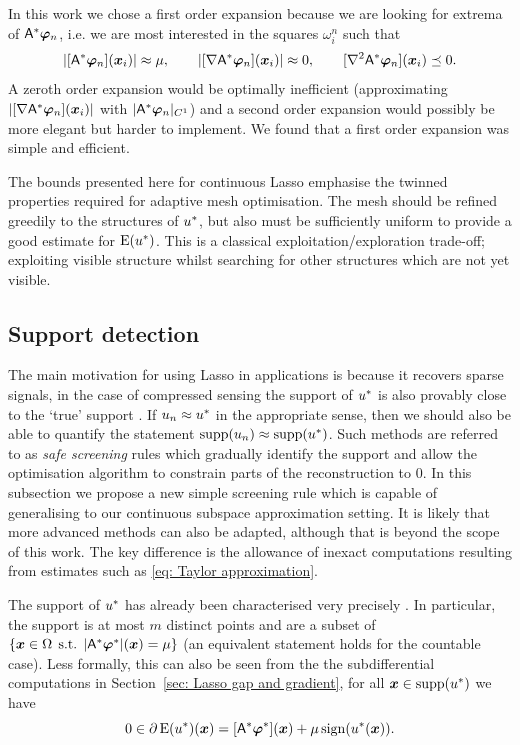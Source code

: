 \documentclass[smallextended]{svjour3}
\newcommand{\op}[1]{\operatorname{#1}}
\newcommand{\1}{\F{1}}
\DeclareMathOperator{\st}{\;s.t.\;}
\DeclareMathOperator{\supp}{supp}
\DeclareMathOperator{\sign}{sign}
\newcommand*{\varf}[1]{%
	\IfEqCase{#1}{%
		{0}{u}%
		{1}{v}%
		{2}{w}%
	}[u#1]%
}
\newcommand*{\vard}[1]{%
	\IfEqCase{#1}{%
		{0}{\varphi}%
		{1}{\psi}%
	}[\varphi #1]%
}
\newcommand*{\varx}[1]{%
	\IfEqCase{#1}{%
		{0}{x}%
		{1}{y}%
		{2}{z}%
		{3}{r}%
	}[x#1]%
}
\newcommand{\Domain}{\Omega}\newcommand{\domain}{\omega}
\newcommand*{\vvarx}[1]{\vec{\varx{#1}}}
\newcommand*{\vvard}[1]{\vec{\vard{#1}}}
\newcommand{\edit}[2]{{\ifmmode\text{\color{red}\sout{\ensuremath{#1}}}\else {\color{red} \sout{#1}}\fi} {\color{darkgreen} #2}}
\begin{document}
	In this work we chose a first order expansion because we are looking for extrema of $\A^*\vvard0_n$, i.e. we are most interested in the squares $\domain_i^n$ such that 
	\begin{equation}
		|[\A^*\vvard0_n](\vvarx0_i)| \approx \mu, \qquad |[\nabla\A^*\vvard0_n](\vvarx0_i)| \approx 0, \qquad [\nabla^2\A^*\vvard0_n](\vvarx0_i) \preceq 0. 
	\end{equation}
	A zeroth order expansion would be optimally inefficient (approximating $|[\nabla\A^*\vvard0_n](\vvarx0_i)|$ with $|\A^*\vvard0_n|_{C^1}$) and a second order expansion would possibly be more elegant but harder to implement. We found that a first order expansion was simple and efficient.
	
	The bounds presented here for continuous Lasso emphasise the twinned properties required for adaptive mesh optimisation. The mesh should be refined greedily to the structures of $\varf0^*$, but also must be sufficiently uniform to provide a good estimate for $\op{E}(\varf0^*)$. This is a classical exploitation/exploration trade-off; exploiting visible structure whilst searching for other structures which are not yet visible.
	
	
	
	\subsection{Support detection}\label{sec: support detection}
	The main motivation for using Lasso in applications is because it recovers sparse signals, in the case of compressed sensing the support of $\varf0^*$ is also provably close to the `true' support \cite{Duval2017a,Poon2018}. If $\varf0_n\approx \varf0^*$ in the appropriate sense, then we should also be able to quantify the statement $\op{supp}(\varf0_n)\approx\op{supp}(\varf0^*)$. Such methods are referred to as \emph{safe screening} rules \cite{ElGhaoui2010} which gradually identify the support and allow the optimisation algorithm to constrain parts of the reconstruction to 0. In this subsection we propose a new simple screening rule which is capable of generalising to our continuous subspace approximation setting. It is likely that more advanced methods \cite{Bonnefoy2015,Ndiaye2017} can also be adapted, although that is beyond the scope of this work. The key difference is the allowance of inexact computations resulting from estimates such as \eqref{eq: Taylor approximation}.
	
	The support of $\varf0^*$ has already been characterised very precisely \cite{Duval2017a,Poon2018}. In particular, the support is at most $m$ distinct points and are a subset of $\{ \vvarx0\in\Domain \st |\A^*\vvard0^*|(\vvarx0) = \mu\} $ (an equivalent statement holds for the countable case). Less formally, this can also be seen from the the \edit{gradient}{subdifferential} computations in Section~\ref{sec: Lasso gap and gradient}, for all $\vvarx0\in\supp(\varf0^*)$ we have
	\begin{equation}
		0\in \partial \op{E}(\varf0^*)(\vvarx0) = [\A^*\vvard0^*](\vvarx0) + \mu\sign(\varf0^*(\vvarx0)).
	\end{equation}
	
\end{document}
